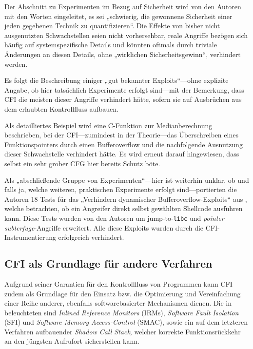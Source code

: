 \documentclass[11pt]{article}
\begin{document}
Der Abschnitt zu Experimenten im Bezug auf Sicherheit wird von den Autoren mit
den Worten eingeleitet, es sei „schwierig, die gewonnene Sicherheit einer jeden
gegebenen Technik zu quantifizieren“. Die Effekte von bisher nicht ausgenutzten
Schwachstellen seien nicht vorhersehbar, reale Angriffe bezögen sich häufig auf
systemspezifische Details und könnten oftmals durch triviale Änderungen an
diesen Details, ohne „wirklichen Sicherheitsgewinn“, verhindert werden.

Es folgt die Beschreibung einiger „gut bekannter Exploits“—ohne explizite
Angabe, ob hier tatsächlich Experimente erfolgt sind—mit der Bemerkung, dass
CFI die meisten dieser Angriffe verhindert hätte, sofern sie auf Ausbrüchen aus
dem erlaubten Kontrollfluss aufbauen.

Als detailliertes Beispiel wird eine C-Funktion zur Medianberechnung
beschrieben, bei der CFI—zumindest in der Theorie—das Überschreiben eines
Funktionspointers durch einen Bufferoverflow und die nachfolgende Ausnutzung
dieser Schwachstelle verhindert hätte. Es wird erneut darauf hingewiesen, dass
selbst ein sehr grober CFG hier bereits Schutz böte.

Als „abschließende Gruppe von Experimenten“—hier ist weiterhin unklar, ob und
falls ja, welche weiteren, praktischen Experimente erfolgt sind—portierten die
Autoren 18 Tests für das „Verhindern dynamischer Bufferoverflow-Exploits“ aus
\cite{wilander2003comparison}, welche betrachten, ob ein Angreifer direkt
selbst gewählten Shellcode ausführen kann. Diese Tests wurden von den Autoren
um jump-to-\texttt{libc} und \emph{pointer subterfuge}-Angriffe erweitert. Alle
diese Exploits wurden durch die CFI-Instrumentierung erfolgreich verhindert.

\subsection{CFI als Grundlage für andere Verfahren}

Aufgrund seiner Garantien für den Kontrollfluss von Programmen kann CFI zudem
als Grundlage für den Einsatz bzw. die Optimierung und Vereinfachung einer
Reihe anderer, ebenfalls softwarebasierter Mechanismen dienen. Die in
\cite{abadi-2009-control-tissec} beleuchteten sind \emph{Inlined Reference
Monitors} (IRMs), \emph{Software Fault Isolation} (SFI) und \emph{Software
Memory Access-Control} (SMAC), sowie ein auf dem letzteren Verfahren
aufbauender \emph{Shadow Call Stack}, welcher korrekte Funktionsrückkehr an den
jüngsten Aufrufort sicherstellen kann.
\end{document}
